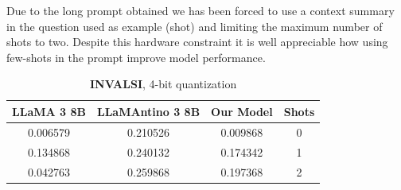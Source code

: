 \documentclass{article}
\begin{document}
	\begin{center}
	\end{center}
	
	Due to the long prompt obtained we has been forced to use a context summary in the question used as example (shot) and limiting the maximum number of shots to two. 
	Despite this hardware constraint it is well appreciable how using few-shots in the prompt improve model performance. 
	
	\begin{table}[h]
		\center
		\begin{tabular}{cccc}
			\toprule
			\textbf{LLaMA 3 8B} & \textbf{LLaMAntino 3 8B} & \textbf{Our Model} & \textbf{Shots}\\
			\midrule
			0.006579 & 0.210526 & 0.009868 & 0\\
			\midrule
			0.134868 & 0.240132 & 0.174342 & 1\\
			\midrule
			0.042763 & 0.259868 & 0.197368 & 2\\
			\bottomrule
		\end{tabular}
		\caption{\textbf{INVALSI}, 4-bit quantization}
	\end{table} 

	
\end{document}

